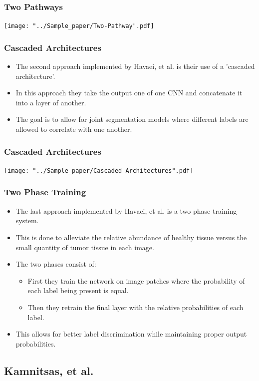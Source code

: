 \documentclass{beamer}
\begin{document}
\begin{frame}
  \frametitle{Two Pathways}
  \texttt{[image: "../Sample\_paper/Two-Pathway".pdf]}
\end{frame}

\begin{frame}
  \frametitle{Cascaded Architectures}
  \begin{itemize}
	\item The second approach implemented by Havaei, et al. is their use of a 'cascaded architecture'.
	\pause
	\item In this approach they take the output one of one CNN and concatenate it into a layer of another.
	\pause
	\item The goal is to allow for joint segmentation models where different labels are allowed to correlate with one another.
  \end{itemize}
\end{frame}

\begin{frame}
  \frametitle{Cascaded Architectures}
  \texttt{[image: "../Sample\_paper/Cascaded Architectures".pdf]}
\end{frame}

\begin{frame}
  \frametitle{Two Phase Training}
  \begin{itemize}
	\item The last approach implemented by Havaei, et al. is a two phase training system.
	\pause
	\item This is done to alleviate the relative abundance of healthy tissue versus the small quantity of tumor tissue in each image.
	\item The two phases consist of:
	\pause
	\begin{itemize}
	  \item First they train the network on image patches where the probability of each label being present is equal.
	  \item Then they retrain the final layer with the relative probabilities of each label.
	\end{itemize}
	\pause
	\item This allows for better label discrimination while maintaining proper output probabilities.
  \end{itemize}
\end{frame}

\subsection*{Kamnitsas, et al.}
\end{document}
